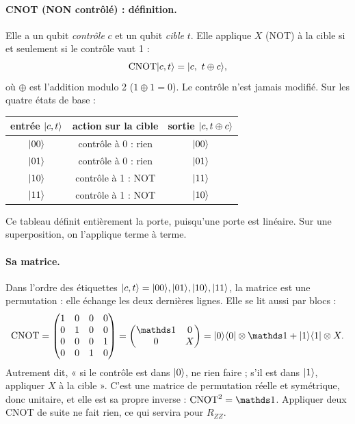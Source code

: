 \paragraph{CNOT (NON contrôlé) : définition.} Elle a un qubit \emph{contrôle} $c$ et un qubit \emph{cible} $t$. Elle applique $X$ (NOT) à la cible si et seulement si le contrôle vaut 1 :
\[
\mathrm{CNOT}\lvert c,t\rangle=\lvert c,\ t\oplus c\rangle,
\]
où $\oplus$ est l'addition modulo 2 ($1\oplus1=0$). Le contrôle n'est jamais modifié. Sur les quatre états de base :
\begin{center}
\begin{tabular}{ccc}
\toprule
entrée $\lvert c,t\rangle$ & action sur la cible & sortie $\lvert c,t\oplus c\rangle$\\
\midrule
$\lvert 00\rangle$ & contrôle à 0 : rien & $\lvert 00\rangle$\\
$\lvert 01\rangle$ & contrôle à 0 : rien & $\lvert 01\rangle$\\
$\lvert 10\rangle$ & contrôle à 1 : NOT & $\lvert 11\rangle$\\
$\lvert 11\rangle$ & contrôle à 1 : NOT & $\lvert 10\rangle$\\
\bottomrule
\end{tabular}
\end{center}
Ce tableau définit entièrement la porte, puisqu'une porte est linéaire. Sur une superposition, on l'applique terme à terme.

\paragraph{Sa matrice.} Dans l'ordre des étiquettes $\lvert c,t\rangle=\lvert 00\rangle,\lvert 01\rangle,\lvert 10\rangle,\lvert 11\rangle$, la matrice est une permutation : elle échange les deux dernières lignes. Elle se lit aussi par blocs :
\[
\mathrm{CNOT}=\begin{pmatrix}1&0&0&0\\0&1&0&0\\0&0&0&1\\0&0&1&0\end{pmatrix}=\begin{pmatrix}\Id&0\\0&X\end{pmatrix}
=\ket0\bra0\otimes\Id+\ket1\bra1\otimes X .
\]
Autrement dit, « si le contrôle est dans $\lvert 0\rangle$, ne rien faire ; s'il est dans $\lvert 1\rangle$, appliquer $X$ à la cible ». C'est une matrice de permutation réelle et symétrique, donc unitaire, et elle est sa propre inverse : $\mathrm{CNOT}^2=\Id$. Appliquer deux CNOT de suite ne fait rien, ce qui servira pour $R_{ZZ}$.

